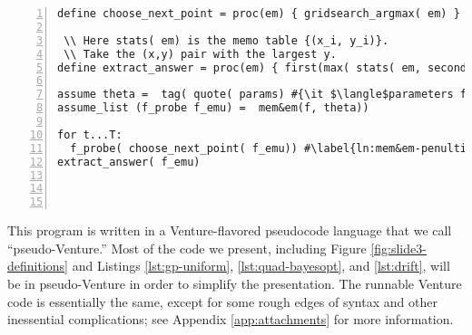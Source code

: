 \begin{lstlisting}[frame=single,escapechar=\#,numbers=left,numbersep=5pt,numberstyle=\tiny\color{gray}]
define choose_next_point = proc(em) { gridsearch_argmax( em) }

 \\ Here stats( em) is the memo table {(x_i, y_i)}.
 \\ Take the (x,y) pair with the largest y.
define extract_answer = proc(em) { first(max( stats( em, second)))}
 
assume theta =  tag( quote( params) #{\it $\langle$parameters for the statistical emulator$\rangle$}#))
assume_list (f_probe f_emu) =  mem&em(f, theta))

for t...T:
  f_probe( choose_next_point( f_emu)) #\label{ln:mem&em-penultimate}#
extract_answer( f_emu)    
    
       
      
\end{lstlisting}
This program is written in a Venture-flavored pseudocode language that we call
``pseudo-Venture.''  Most of the code we present, including Figure
\ref{fig:slide3-definitions} and Listings \ref{lst:gp-uniform},
\ref{lst:quad-bayesopt}, and \ref{lst:drift}, will be in pseudo-Venture in order
to simplify the presentation.  The runnable Venture code is essentially the
same, except for some rough edges of syntax and other inessential complications;
see Appendix \ref{app:attachments} for more information.

